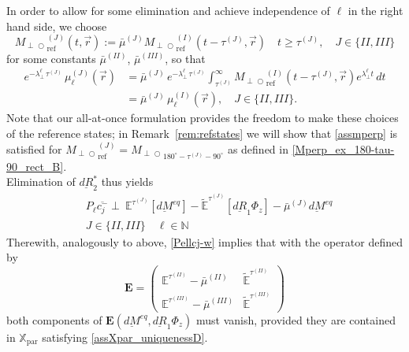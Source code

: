\documentclass{ws-m3as}
\newcommand{\uld}[1]{\underline{d#1}}
\def\Mpp{M_{\perp\!\!\!\!\!\bigcirc}}
\newcommand\Xpar{\mathbb{X}_{\text{par}}}
\begin{document}
In order to allow for some elimination and achieve independence of $\ell$ in the right hand side, we choose 
\begin{equation}\label{assmperp}
{\Mpp}_{\text{ref}}^{(J)}(t,\vec r):=\bar{\mu}^{(J)} {\Mpp}_{\text{ref}}^{(I)}(t-\tau^{(J)},\vec r)
\quad t\geq\tau^{(J)}, \quad J\in\{II,III\}
\end{equation}
for some 
constants 
$\bar{\mu}^{(II)}$, $\bar{\mu}^{(III)}$, 
so that 
\[
\begin{aligned}
e^{-\lambda_\perp^\ell\,\tau^{(J)}}\,\mu_\ell^{(J)}(\vec r)
&
=\bar{\mu}^{(J)}\,e^{-\lambda_\perp^\ell\,\tau^{(J)}}\int_{\tau^{(J)}}^\infty {\Mpp}_{\text{ref}}^{(I)}(t-\tau^{(J)},\vec r) e^{\lambda_\perp^\ell t}\, dt
\\&=
\bar{\mu}^{(J)}\, \mu_\ell^{(I)}(\vec r), \quad J\in\{II,III\}.
\end{aligned}
\] 
Note that our all-at-once formulation provides the freedom to make these choices of the reference states; in Remark~\ref{rem:refstates} we will show that \eqref{assmperp} is satisfied for ${\Mpp}_{\text{ref}}^{(J)}={\Mpp}_{180^\circ-\tau^{(J)}-90^\circ}$ as defined in \eqref{Mperp_ex_180-tau-90_rect_B}.
\\
Elimination of 
$\uld{R}_2^*$ 
thus yields 
\begin{equation}\label{Pellcj-w}
\begin{aligned}
&P_\ell \overline{c_j^-}\perp \ \mathbb{E}^{\tau^{(J)}}[\uld{M}^{eq}]-\widetilde{\mathbb{E}}^{\tau^{(J)}}[\uld{R}_1 \Phi_z]
-\bar{\mu}^{(J)}\uld{M}^{eq}\\ 
&J\in\{II,III\}\quad \ell\in\mathbb{N}
 \end{aligned}
\end{equation}
Therewith, analogously to above, \eqref{Pellcj-w} implies that 
with the operator defined by 
\begin{equation}\label{mathbfE}
\mathbf{E}=
\left(\begin{array}{cc}
\mathbb{E}^{\tau^{(II)}}\!\!\!-\bar{\mu}^{(II)} & \widetilde{\mathbb{E}}^{\tau^{(II)}}\\
\mathbb{E}^{\tau^{(III)}}\!\!\!-\bar{\mu}^{(III)} & \widetilde{\mathbb{E}}^{\tau^{(III)}}
\end{array}\right)
\end{equation}
both components of $\mathbf{E}(\uld{M}^{eq},\uld{R}_1 \Phi_z)$ must vanish, provided they are contained in $\Xpar$ satisfying \eqref{assXpar_uniquenessD}.
\end{document}
